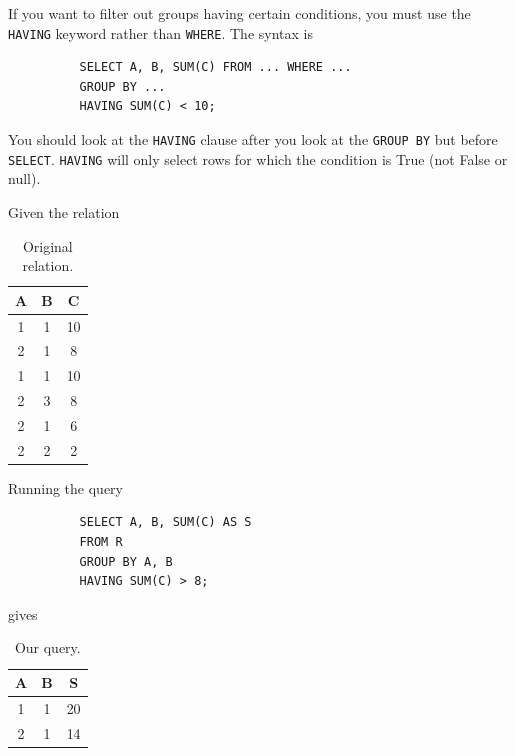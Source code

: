 \documentclass{article}
\begin{document}
      \begin{definition}
        If you want to filter out groups having certain conditions, you must use the \texttt{HAVING} keyword rather than \texttt{WHERE}. The syntax is 
        \begin{lstlisting}
          SELECT A, B, SUM(C) FROM ... WHERE ... 
          GROUP BY ... 
          HAVING SUM(C) < 10; 
        \end{lstlisting}
        You should look at the \texttt{HAVING} clause after you look at the \texttt{GROUP BY} but before \texttt{SELECT}. \texttt{HAVING} will only select rows for which the condition is True (not False or null). 
      \end{definition}

      \begin{example}
        Given the relation 

        \begin{table}[H]
          \centering
          \begin{tabular}{|c|c|c|}
            \hline
            \textbf{A} & \textbf{B} & \textbf{C} \\
            \hline
            1 & 1 & 10 \\ 
            2 & 1 & 8 \\ 
            1 & 1 & 10 \\ 
            2 & 3 & 8 \\ 
            2 & 1 & 6 \\ 
            2 & 2 & 2 \\ 
            \hline
          \end{tabular}
          \caption{Original relation. }
          \label{tab:groupby2}
        \end{table}
      
        Running the query 
        \begin{lstlisting}
          SELECT A, B, SUM(C) AS S 
          FROM R 
          GROUP BY A, B 
          HAVING SUM(C) > 8; 
        \end{lstlisting}
        gives 
        
        \begin{table}[H]
          \centering
          \begin{tabular}{|c|c|c|}
            \hline
            \textbf{A} & \textbf{B} & \textbf{S} \\
            \hline
            1 & 1 & 20 \\ 
            2 & 1 & 14 \\ 
            \hline
          \end{tabular}
          \caption{Our query. }
          \label{tab:groupby2_output}
        \end{table}
      \end{example}
\end{document}
